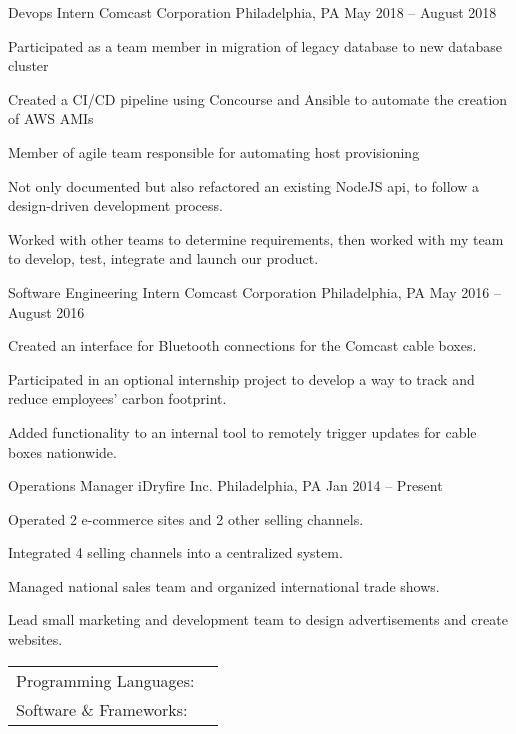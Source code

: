 \documentclass[]{awesome-cv}
\begin{document}
\vspace{-2mm}
\begin{cventries}
	\cventry
	{Devops Intern}
	{Comcast Corporation}
	{Philadelphia, PA}
	{May 2018 – August 2018}
	{\begin{cvitems}
		\item {Participated as a team member in migration of legacy database to new database cluster}
		\item {Created a CI/CD pipeline using Concourse and Ansible to automate the creation of AWS AMIs}
		\item {Member of agile team responsible for automating host provisioning}
		\item {Not only documented but also refactored an existing NodeJS api, to follow a design-driven development process.}
		\item {Worked with other teams to determine requirements, then worked with my team to develop, test, integrate and launch our product.}
		\end{cvitems}}
	\cventry
	{Software Engineering Intern}
	{Comcast Corporation}
	{Philadelphia, PA}
	{May 2016 – August 2016}
	{\begin{cvitems}
		\item {Created an interface for Bluetooth connections for the Comcast cable boxes.}
		\item {Participated in an optional internship project to develop a way to track and reduce employees’ carbon footprint.}
		\item {Added functionality to an internal tool to remotely trigger updates for cable boxes nationwide.}
		\end{cvitems}}
	\cventry
	{Operations Manager}
	{iDryfire Inc.}
	{Philadelphia, PA}
	{Jan 2014 – Present}
	{\begin{cvitems}
		\item {Operated 2 e-commerce sites and 2 other selling channels.}
		\item {Integrated 4 selling channels into a centralized system.}
		\item {Managed national sales team and organized international trade shows.}
		\item {Lead small marketing and development team to design advertisements and create websites.}
		\end{cvitems}}
\end{cventries}
\begin{cventries}
	\cventry
	{}
	{\def\arraystretch{1.15}{\begin{tabular}{ l l }
		Programming Languages:  & {\skill{ Javascript, Python, C/C++}} \\
		Software \& Frameworks:  & {\skill{ Git, Ansible, Concourse (CI/CD), NodeJS, AWS, MySQL, PostgreSQL, MongoDB}} \\
		\end{tabular}}}
	{}
	{}
	{}
\end{cventries}

\vspace{-7mm}


\ 
\end{document}
